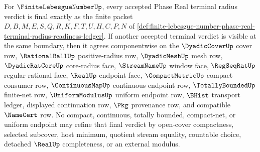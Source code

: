 \begin{theorem}
\label{thm:finite-lebesgue-number-phase-real-terminal-radius-choice-free-finality}
For $\FiniteLebesgueNumberUp$, every accepted Phase Real terminal radius verdict is final exactly as the finite packet $D,B,M,E,S,Q,R,K,F,T,U,H,C,P,N$ of \autoref{def:finite-lebesgue-number-phase-real-terminal-radius-readiness-ledger}. If another accepted terminal verdict is visible at the same boundary, then it agrees componentwise on the $\DyadicCoverUp$ cover row, $\RationalBallUp$ positive-radius row, $\DyadicMeshUp$ mesh row, $\DyadicRatCoreUp$ core-radius face, $\StreamNameUp$ window face, $\RegSeqRatUp$ regular-rational face, $\RealUp$ endpoint face, $\CompactMetricUp$ compact consumer row, $\ContinuousMapUp$ continuous endpoint row, $\TotallyBoundedUp$ finite-net row, $\UniformModulusUp$ uniform endpoint row, $\BHist$ transport ledger, displayed continuation row, $\Pkg$ provenance row, and compatible $\NameCert$ row. No compact, continuous, totally bounded, compact-net, or uniform endpoint may refine that final verdict by open-cover compactness, selected subcover, host minimum, quotient stream equality, countable choice, detached $\RealUp$ completeness, or an external modulus.
\end{theorem}
